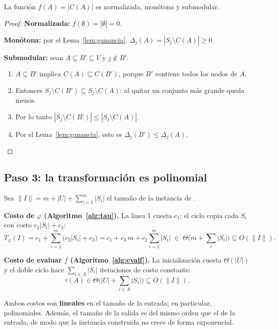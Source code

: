 \begin{lema}\label{lem:valida}
La función $f(A)=|C(A)|$ es normalizada, monótona y submodular.
\end{lema}
\begin{proof}
\textbf{Normalizada:} $f(\emptyset)=|\emptyset|=0$.

\textbf{Monótona:} por el Lema~\ref{lem:ganancia}, $\Delta_j(A)=|S_j\setminus C(A)|\ge 0$.

\textbf{Submodular:} sean $A\subseteq B'\subseteq V$ y $j\notin B'$.
\begin{enumerate}
  \item $A\subseteq B'$ implica $C(A)\subseteq C(B')$, porque $B'$ contiene todos los nodos de $A$.
  \item Entonces $S_j\setminus C(B')\subseteq S_j\setminus C(A)$: al quitar un conjunto más grande queda menos.
  \item Por lo tanto $|S_j\setminus C(B')|\le|S_j\setminus C(A)|$.
  \item Por el Lema~\ref{lem:ganancia}, esto es $\Delta_j(B')\le\Delta_j(A)$. \qedhere
\end{enumerate}
\end{proof}

\subsection{Paso 3: la transformación es polinomial}

Sea $\|I\| = m + |U| + \sum_{i=1}^{m}|S_i|$ el tamaño de la instancia de \MC.

\textbf{Costo de $\varphi$ (Algoritmo~\ref{alg:tau}).} La línea 1 cuesta $c_1$; el ciclo copia cada $S_i$ con costo $c_2|S_i|+c_3$:
\[
T_\varphi(I) = c_1 + \sum_{i=1}^{m}\big(c_2|S_i| + c_3\big) = c_1 + c_3\,m + c_2\sum_{i=1}^{m}|S_i| \;\in\; \Theta\Big(m + \sum_{i}|S_i|\Big)\subseteq O(\|I\|).
\]

\textbf{Costo de evaluar $f$ (Algoritmo~\ref{alg:evalf}).} La inicialización cuesta $\Theta(|U|)$ y el doble ciclo hace $\sum_{i\in A}|S_i|$ iteraciones de costo constante:
\[
\tau(A) \in \Theta\Big(|U| + \sum_{i\in A}|S_i|\Big)\subseteq O(\|I\|).
\]

Ambos costos son \textbf{lineales} en el tamaño de la entrada; en particular, polinomiales. Además, el tamaño de la salida es del mismo orden que el de la entrada, de modo que la instancia construida no crece de forma exponencial.

